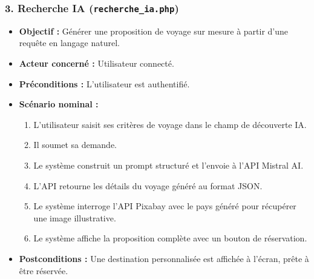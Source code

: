 \documentclass[a4paper,12pt]{article}
\begin{document}
\subsubsection*{3. Recherche IA (\texttt{recherche\_ia.php})}
\begin{itemize}[label=\textbullet]
    \item \textbf{Objectif :} Générer une proposition de voyage sur mesure à partir d'une requête en langage naturel.
    \item \textbf{Acteur concerné :} Utilisateur connecté.
    \item \textbf{Préconditions :} L'utilisateur est authentifié.
    \item \textbf{Scénario nominal :}
    \begin{enumerate}[label=\arabic*.]
        \item L'utilisateur saisit ses critères de voyage dans le champ de découverte IA.
        \item Il soumet sa demande.
        \item Le système construit un prompt structuré et l'envoie à l'API Mistral AI.
        \item L'API retourne les détails du voyage généré au format JSON.
        \item Le système interroge l'API Pixabay avec le pays généré pour récupérer une image illustrative.
        \item Le système affiche la proposition complète avec un bouton de réservation.
    \end{enumerate}
    \item \textbf{Postconditions :} Une destination personnalisée est affichée à l'écran, prête à être réservée.
\end{itemize}

\vspace{0.3cm}

\end{document}

